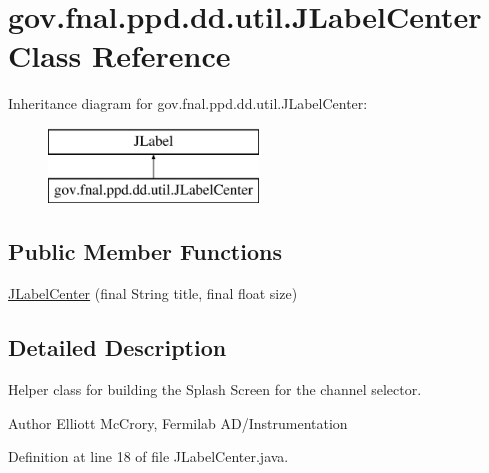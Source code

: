 \hypertarget{classgov_1_1fnal_1_1ppd_1_1dd_1_1util_1_1JLabelCenter}{\section{gov.\-fnal.\-ppd.\-dd.\-util.\-J\-Label\-Center Class Reference}
\label{classgov_1_1fnal_1_1ppd_1_1dd_1_1util_1_1JLabelCenter}
}
Inheritance diagram for gov.\-fnal.\-ppd.\-dd.\-util.\-J\-Label\-Center\-:\begin{figure}[H]
\begin{center}
\leavevmode
\includegraphics[height=2.000000cm]{classgov_1_1fnal_1_1ppd_1_1dd_1_1util_1_1JLabelCenter}
\end{center}
\end{figure}
\subsection*{Public Member Functions}
\begin{DoxyCompactItemize}
\item 
\hyperlink{classgov_1_1fnal_1_1ppd_1_1dd_1_1util_1_1JLabelCenter_a6223bcd346ebe5b17863464b2ed74379}{J\-Label\-Center} (final String title, final float size)
\end{DoxyCompactItemize}


\subsection{Detailed Description}
Helper class for building the Splash Screen for the channel selector.

\begin{DoxyAuthor}{Author}
Elliott Mc\-Crory, Fermilab A\-D/\-Instrumentation 
\end{DoxyAuthor}


Definition at line 18 of file J\-Label\-Center.\-java.




